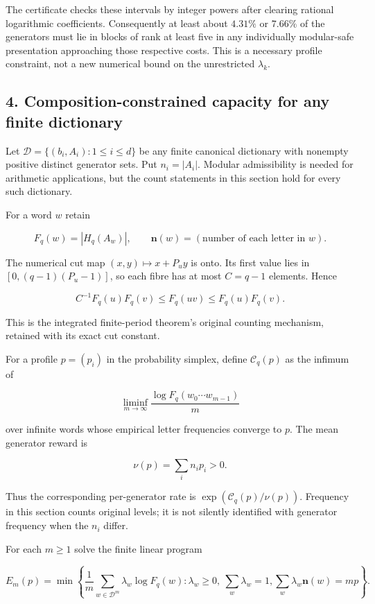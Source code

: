 The certificate checks these intervals by integer powers after clearing rational logarithmic coefficients. Consequently at least about \(4.31\%\) or \(7.66\%\) of the generators must lie in blocks of rank at least five in any individually modular-safe presentation approaching those respective costs. This is a necessary profile constraint, not a new numerical bound on the unrestricted \(\lambda_k\).

\subsection{4. Composition-constrained capacity for any finite dictionary}\label{eporig:composition-constrained-capacity-for-any-finite-dictionary}

Let \(\mathcal D=\{(b_i,A_i):1\le i\le d\}\) be any finite canonical dictionary with nonempty positive distinct generator sets. Put \(n_i=|A_i|\). Modular admissibility is needed for arithmetic applications, but the count statements in this section hold for every such dictionary.

For a word \(w\) retain

\[
F_q(w)=|H_q(A_w)|,
\qquad \mathbf n(w)=(\text{number of each letter in }w).
\]

The numerical cut map \((x,y)\mapsto x+P_uy\) is onto. Its first value lies in \([0,(q-1)(P_u-1)]\), so each fibre has at most \(C=q-1\) elements. Hence

\[
\boxed{C^{-1}F_q(u)F_q(v)\le F_q(uv)\le F_q(u)F_q(v).}
\tag{4.1}
\]

This is the integrated finite-period theorem's original counting mechanism, retained with its exact cut constant.

For a profile \(p=(p_i)\) in the probability simplex, define \(\mathcal C_q(p)\) as the infimum of

\[
\liminf_{m\to\infty}\frac{\log F_q(w_0\cdots w_{m-1})}{m}
\]

over infinite words whose empirical letter frequencies converge to \(p\). The mean generator reward is

\[
\nu(p)=\sum_i n_i p_i>0.
\]

Thus the corresponding per-generator rate is \(\exp(\mathcal C_q(p)/\nu(p))\). Frequency in this section counts original levels; it is not silently identified with generator frequency when the \(n_i\) differ.

For each \(m\ge1\) solve the finite linear program

\[
E_m(p)=\min\left\{
\frac1m\sum_{w\in\mathcal D^m}\lambda_w\log F_q(w):
\lambda_w\ge0,\ \sum_w\lambda_w=1,
\sum_w\lambda_w\mathbf n(w)=mp
\right\}.
\tag{4.2}
\]

